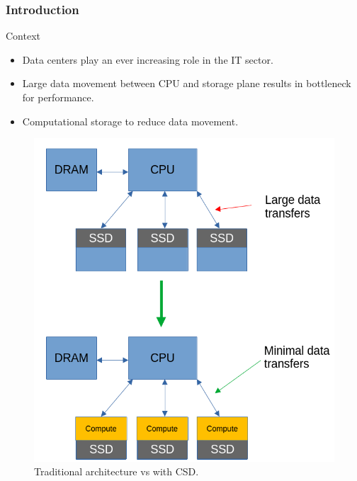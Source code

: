 \begin{frame}[hoved]
	\frametitle{Introduction}
	\begin{minipage}[t]{0.45\textwidth}
		{\large Context}
		\begin{itemize}
			\item Data centers play an ever increasing role in the IT sector.
			\item Large data movement between CPU and storage plane results in
			      bottleneck for performance.
			\item Computational storage to reduce data movement.
		\end{itemize}
	\end{minipage}
	\hfill
	\begin{minipage}[t]{0.45\textwidth}
		\begin{figure}
			\begin{center}
				\includegraphics[height=0.55\textheight]{figures/CSD.png}
			\end{center}
			\caption{Traditional architecture vs with CSD.}\label{fig:openssd}
		\end{figure}
	\end{minipage}
\end{frame}

